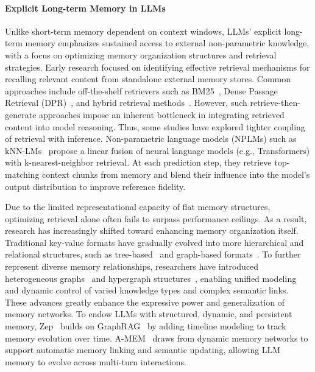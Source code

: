 \documentclass[]{memtensor}
\begin{document}
\paragraph{\textbf{Explicit Long-term Memory in LLMs}}
Unlike short-term memory dependent on context windows, LLMs' explicit long-term memory emphasizes sustained access to external non-parametric knowledge, with a focus on optimizing memory organization structures and retrieval strategies.
Early research focused on identifying effective retrieval mechanisms for recalling relevant content from standalone external memory stores. Common approaches include off-the-shelf retrievers such as BM25~\cite{DBLP:journals/ftir/RobertsonZ09}, Dense Passage Retrieval (DPR)~\cite{DBLP:conf/emnlp/ReimersG19}, and hybrid retrieval methods~\cite{Ensemble-Retriever}.
However, such retrieve-then-generate approaches impose an inherent bottleneck in integrating retrieved content into model reasoning. Thus, some studies have explored tighter coupling of retrieval with inference. Non-parametric language models (NPLMs) such as kNN-LMs~\cite{khandelwal_knnlm_2019,pozzobon_goodtriever_2023} propose a linear fusion of neural language models (e.g., Transformers) with k-nearest-neighbor retrieval. At each prediction step, they retrieve top-matching context chunks from memory and blend their influence into the model’s output distribution to improve reference fidelity.

Due to the limited representational capacity of flat memory structures, optimizing retrieval alone often fails to surpass performance ceilings. As a result, research has increasingly shifted toward enhancing memory organization itself. Traditional key-value formats have gradually evolved into more hierarchical and relational structures, such as tree-based~\cite{DBLP:journals/corr/abs-2310-05029} and graph-based formats~\cite{DBLP:journals/corr/abs-2404-16130,DBLP:journals/corr/abs-2410-05779}.
To further represent diverse memory relationships, researchers have introduced heterogeneous graphs~\cite{xu2025noderagstructuringgraphbasedrag,yang2025heteragheterogeneousretrievalaugmentedgeneration} and hypergraph structures~\cite{DBLP:journals/corr/abs-2503-21322}, enabling unified modeling and dynamic control of varied knowledge types and complex semantic links. These advances greatly enhance the expressive power and generalization of memory networks. To endow LLMs with structured, dynamic, and persistent memory, Zep~\cite{DBLP:journals/corr/abs-2501-13956} builds on GraphRAG~\cite{DBLP:journals/corr/abs-2404-16130} by adding timeline modeling to track memory evolution over time. A-MEM~\cite{DBLP:journals/corr/abs-2502-12110} draws from dynamic memory networks to support automatic memory linking and semantic updating, allowing LLM memory to evolve across multi-turn interactions.
\end{document}
